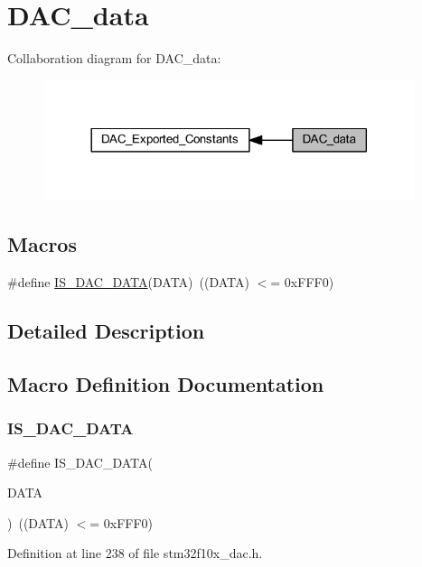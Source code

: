 \hypertarget{group___d_a_c__data}{}\section{D\+A\+C\+\_\+data}
\label{group___d_a_c__data}
Collaboration diagram for D\+A\+C\+\_\+data\+:
\nopagebreak
\begin{figure}[H]
\begin{center}
\leavevmode
\includegraphics[width=308pt]{group___d_a_c__data}
\end{center}
\end{figure}
\subsection*{Macros}
\begin{DoxyCompactItemize}
\item 
\#define \hyperlink{group___d_a_c__data_ga903e28d4971e172b37c1c2fc17c2a884}{I\+S\+\_\+\+D\+A\+C\+\_\+\+D\+A\+TA}(D\+A\+TA)~((D\+A\+TA) $<$= 0x\+F\+F\+F0)
\end{DoxyCompactItemize}


\subsection{Detailed Description}


\subsection{Macro Definition Documentation}
\mbox{\label{group___d_a_c__data_ga903e28d4971e172b37c1c2fc17c2a884}} 
\subsubsection{\texorpdfstring{I\+S\+\_\+\+D\+A\+C\+\_\+\+D\+A\+TA}{IS\_DAC\_DATA}}
{\footnotesize\ttfamily \#define I\+S\+\_\+\+D\+A\+C\+\_\+\+D\+A\+TA(\begin{DoxyParamCaption}\item[{}]{D\+A\+TA }\end{DoxyParamCaption})~((D\+A\+TA) $<$= 0x\+F\+F\+F0)}



Definition at line 238 of file stm32f10x\+\_\+dac.\+h.

